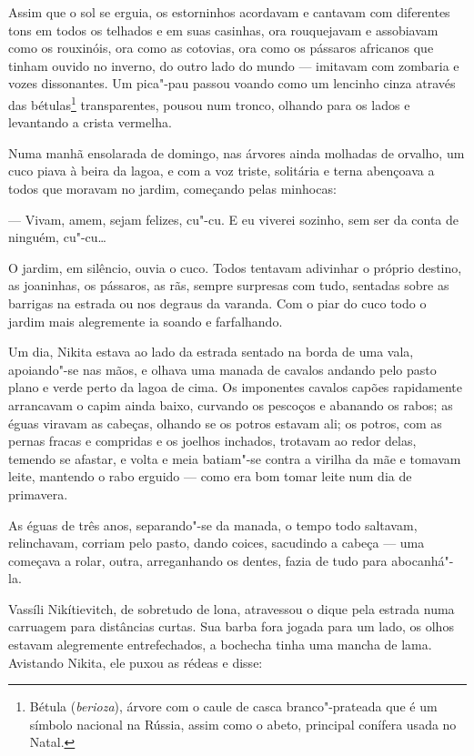 Assim que o sol se erguia, os estorninhos acordavam e cantavam com
diferentes tons em todos os telhados e em suas casinhas, ora rouquejavam
e assobiavam como os rouxinóis, ora como as cotovias, ora como os
pássaros africanos que tinham ouvido no inverno, do outro lado do mundo
--- imitavam com zombaria e vozes dissonantes. Um pica"-pau passou voando
como um lencinho cinza através das bétulas\footnote{Bétula (\emph{berioza}), árvore com o caule de casca branco"-prateada que é um símbolo nacional na Rússia, assim como o abeto, principal conífera usada no Natal.} transparentes, pousou num
tronco, olhando para os lados e levantando a crista vermelha.

Numa manhã ensolarada de domingo, nas árvores ainda molhadas de orvalho,
um cuco piava à beira da lagoa, e com a voz triste, solitária e terna
abençoava a todos que moravam no jardim, começando pelas minhocas:

--- Vivam, amem, sejam felizes, cu"-cu. E eu viverei sozinho, sem ser da
conta de ninguém, cu"-cu\ldots{}

O jardim, em silêncio, ouvia o cuco. Todos tentavam adivinhar o próprio
destino, as joaninhas, os pássaros, as rãs, sempre surpresas com tudo,
sentadas sobre as barrigas na estrada ou nos degraus da varanda. Com o
piar do cuco todo o jardim mais alegremente ia soando e farfalhando.

Um dia, Nikita estava ao lado da estrada sentado na borda de uma vala,
apoiando"-se nas mãos, e olhava uma manada de cavalos andando pelo pasto
plano e verde perto da lagoa de cima. Os imponentes cavalos capões
rapidamente arrancavam o capim ainda baixo, curvando os pescoços e
abanando os rabos; as éguas viravam as cabeças, olhando se os potros
estavam ali; os potros, com as pernas fracas e compridas e os joelhos
inchados, trotavam ao redor delas, temendo se afastar, e volta e meia
batiam"-se contra a virilha da mãe e tomavam leite, mantendo o rabo
erguido --- como era bom tomar leite num dia de primavera.

As éguas de três anos, separando"-se da manada, o tempo todo saltavam,
relinchavam, corriam pelo pasto, dando coices, sacudindo a cabeça ---
uma começava a rolar, outra, arreganhando os dentes, fazia de tudo para
abocanhá"-la.

Vassíli Nikítievitch, de sobretudo de lona, atravessou o dique pela
estrada numa carruagem para distâncias curtas. Sua barba fora jogada
para um lado, os olhos estavam alegremente entrefechados, a bochecha
tinha uma mancha de lama. Avistando Nikita, ele puxou as rédeas e disse:

